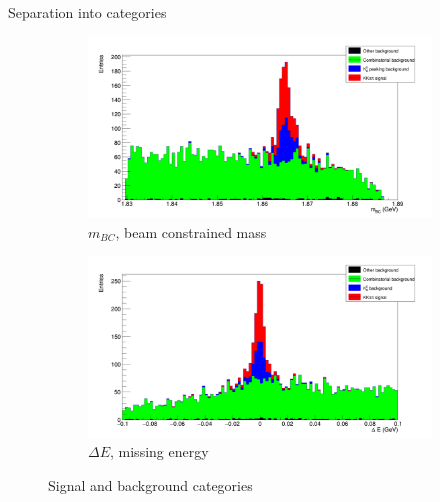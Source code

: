\documentclass{beamer}
\begin{document}
\begin{frame}{Separation into categories}
  \begin{figure}
    \centering
    \begin{subfigure}{0.5\textwidth}
      \centering
      \includegraphics[width=\textwidth]{MBC_Composition.png}
      \caption{$m_{BC}$, beam constrained mass}
    \end{subfigure}%
    \begin{subfigure}{0.5\textwidth}
      \centering
      \includegraphics[width=\textwidth]{DeltaE_Composition.png}
      \caption{$\Delta E$, missing energy}
    \end{subfigure}
    \caption{Signal and background categories}
  \end{figure}
\end{frame}
\end{document}
